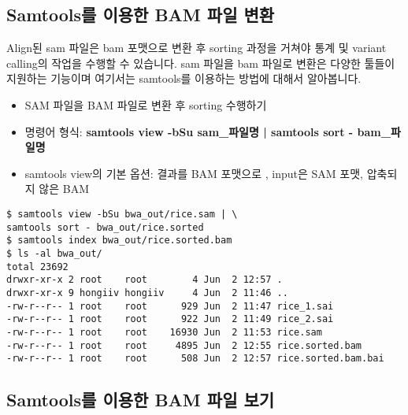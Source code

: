 \documentclass{article}
\begin{document}
\subsection{Samtools를 이용한 BAM 파일 변환}
Align된 sam 파일은 bam 포맷으로 변환 후 sorting 과정을 거쳐야 통계 및 variant calling의 작업을 수행할 수 있습니다. sam 파일을 bam 파일로 변환은 다양한 툴들이 지원하는 기능이며 여기서는 samtools를 이용하는 방법에 대해서 알아봅니다.

\begin{itemize}
\item
  \begin{itemize}
  SAM 파일을 BAM 파일로 변환 후 sorting 수행하기  
  \end{itemize}
\end{itemize}
\begin{itemize}
\item
  \begin{itemize}
   명령어 형식: \textbf{samtools view -bSu sam\_파일명 | samtools sort - bam\_파일명}
  \end{itemize}
\end{itemize}
\begin{itemize}
\item
  \begin{itemize}
   samtools view의 기본 옵션:  결과를 BAM 포맷으로 ,  input은 SAM 포맷,  압축되지 않은 BAM
  \end{itemize}
\end{itemize}

\begin{lstlisting}[frame=single,style=Bash,xleftmargin=1.4cm,xrightmargin=1.4cm]
$ samtools view -bSu bwa_out/rice.sam | \
samtools sort - bwa_out/rice.sorted
$ samtools index bwa_out/rice.sorted.bam 
$ ls -al bwa_out/
total 23692
drwxr-xr-x 2 root    root        4 Jun  2 12:57 .
drwxr-xr-x 9 hongiiv hongiiv     4 Jun  2 11:46 ..
-rw-r--r-- 1 root    root      929 Jun  2 11:47 rice_1.sai
-rw-r--r-- 1 root    root      922 Jun  2 11:49 rice_2.sai
-rw-r--r-- 1 root    root    16930 Jun  2 11:53 rice.sam
-rw-r--r-- 1 root    root     4895 Jun  2 12:55 rice.sorted.bam
-rw-r--r-- 1 root    root      508 Jun  2 12:57 rice.sorted.bam.bai
\end{lstlisting}

\subsection{Samtools를 이용한 BAM 파일 보기}
\end{document}
